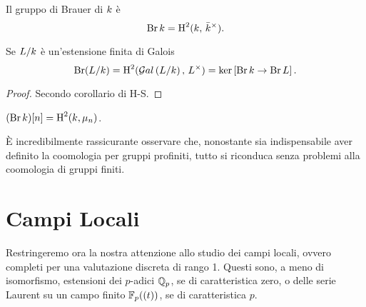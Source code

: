 \begin{definition}
	Il gruppo di Brauer di $ k $ è $$  \operatorname{Br} k = \operatorname{H}^2(k, \, \bar{k}^\times).  $$
\end{definition}



\begin{proposition}
	Se $ L/k $ è un'estensione finita di Galois
	\[ \operatorname{Br}(L/k) = \operatorname{H}^2(\mathcal{G}al\left( L/k \right), \, L^\times) = \ker  \left[\operatorname{Br} k \to \operatorname{Br} L\right].  \]
\end{proposition}
\begin{proof}
	Secondo corollario di H-S.
\end{proof}

\begin{lemma}
	$ (\operatorname{Br} k) [n] = \operatorname{H}^2(k, \mu_n) $.
\end{lemma}

\begin{profinite}
	È incredibilmente rassicurante osservare che, nonostante sia indispensabile aver definito la coomologia per gruppi profiniti, tutto si riconduca senza problemi alla coomologia di gruppi finiti.
\end{profinite}

\section{Campi Locali}
Restringeremo ora la nostra attenzione allo studio dei campi locali, ovvero completi per una valutazione discreta di rango 1. Questi sono, a meno di isomorfismo, estensioni dei $ p $-adici $ \mathbb{Q}_p $, se di caratteristica zero, o delle serie Laurent su un campo finito $ \mathbb{F}_p((t)) $, se di caratteristica $ p $. \\

